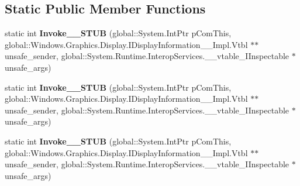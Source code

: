 \subsection*{Static Public Member Functions}
\begin{DoxyCompactItemize}
\item 
\mbox{\label{struct_windows_1_1_foundation_1_1_typed_event_handler___a___windows___graphics___display___displ2d6db8e7cf1fc629bdbfb5ccc4ead7c7_a9ed71dc80f2f901c787ce2b33ef89584}} 
static int {\bfseries Invoke\+\_\+\+\_\+\+S\+T\+UB} (global\+::\+System.\+Int\+Ptr p\+Com\+This, global\+::\+Windows.\+Graphics.\+Display.\+I\+Display\+Information\+\_\+\+\_\+\+Impl.\+Vtbl $\ast$$\ast$unsafe\+\_\+sender, global\+::\+System.\+Runtime.\+Interop\+Services.\+\_\+\+\_\+vtable\+\_\+\+I\+Inspectable $\ast$unsafe\+\_\+args)
\item 
\mbox{\label{struct_windows_1_1_foundation_1_1_typed_event_handler___a___windows___graphics___display___displ2d6db8e7cf1fc629bdbfb5ccc4ead7c7_a9ed71dc80f2f901c787ce2b33ef89584}} 
static int {\bfseries Invoke\+\_\+\+\_\+\+S\+T\+UB} (global\+::\+System.\+Int\+Ptr p\+Com\+This, global\+::\+Windows.\+Graphics.\+Display.\+I\+Display\+Information\+\_\+\+\_\+\+Impl.\+Vtbl $\ast$$\ast$unsafe\+\_\+sender, global\+::\+System.\+Runtime.\+Interop\+Services.\+\_\+\+\_\+vtable\+\_\+\+I\+Inspectable $\ast$unsafe\+\_\+args)
\item 
\mbox{\label{struct_windows_1_1_foundation_1_1_typed_event_handler___a___windows___graphics___display___displ2d6db8e7cf1fc629bdbfb5ccc4ead7c7_a9ed71dc80f2f901c787ce2b33ef89584}} 
static int {\bfseries Invoke\+\_\+\+\_\+\+S\+T\+UB} (global\+::\+System.\+Int\+Ptr p\+Com\+This, global\+::\+Windows.\+Graphics.\+Display.\+I\+Display\+Information\+\_\+\+\_\+\+Impl.\+Vtbl $\ast$$\ast$unsafe\+\_\+sender, global\+::\+System.\+Runtime.\+Interop\+Services.\+\_\+\+\_\+vtable\+\_\+\+I\+Inspectable $\ast$unsafe\+\_\+args)
\item 
\mbox{\label{struct_windows_1_1_foundation_1_1_typed_event_handler___a___windows___graphics___display___displ2d6db8e7cf1fc629bdbfb5ccc4ead7c7_a9ed71dc80f2f901c787ce2b33ef89584}} 
$$
\end{DoxyCompactItemize}
